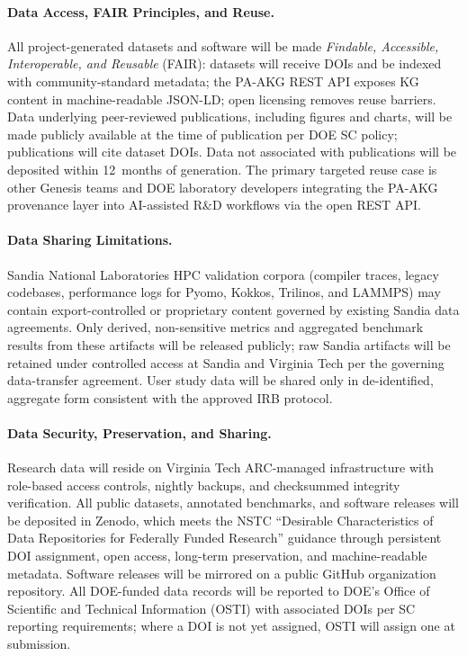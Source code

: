 \paragraph{Data Access, FAIR Principles, and Reuse.}
All project-generated datasets and software will be made \emph{Findable, Accessible, Interoperable, and Reusable} (FAIR): datasets will receive DOIs and be indexed with community-standard metadata; the PA-AKG REST API exposes KG content in machine-readable JSON-LD; open licensing removes reuse barriers.
Data underlying peer-reviewed publications, including figures and charts, will be made publicly available at the time of publication per DOE SC policy; publications will cite dataset DOIs.
Data not associated with publications will be deposited within 12~months of generation.
The primary targeted reuse case is other Genesis teams and DOE laboratory developers integrating the PA-AKG provenance layer into AI-assisted R\&D workflows via the open REST API.

\paragraph{Data Sharing Limitations.}
Sandia National Laboratories HPC validation corpora (compiler traces, legacy codebases, performance logs for Pyomo, Kokkos, Trilinos, and LAMMPS) may contain export-controlled or proprietary content governed by existing Sandia data agreements.
Only derived, non-sensitive metrics and aggregated benchmark results from these artifacts will be released publicly; raw Sandia artifacts will be retained under controlled access at Sandia and Virginia Tech per the governing data-transfer agreement.
User study data will be shared only in de-identified, aggregate form consistent with the approved IRB protocol.

\paragraph{Data Security, Preservation, and Sharing.}
Research data will reside on Virginia Tech ARC-managed infrastructure with role-based access controls, nightly backups, and checksummed integrity verification.
All public datasets, annotated benchmarks, and software releases will be deposited in Zenodo, which meets the NSTC ``Desirable Characteristics of Data Repositories for Federally Funded Research'' guidance through persistent DOI assignment, open access, long-term preservation, and machine-readable metadata.
Software releases will be mirrored on a public GitHub organization repository.
All DOE-funded data records will be reported to DOE's Office of Scientific and Technical Information (OSTI) with associated DOIs per SC reporting requirements; where a DOI is not yet assigned, OSTI will assign one at submission.

